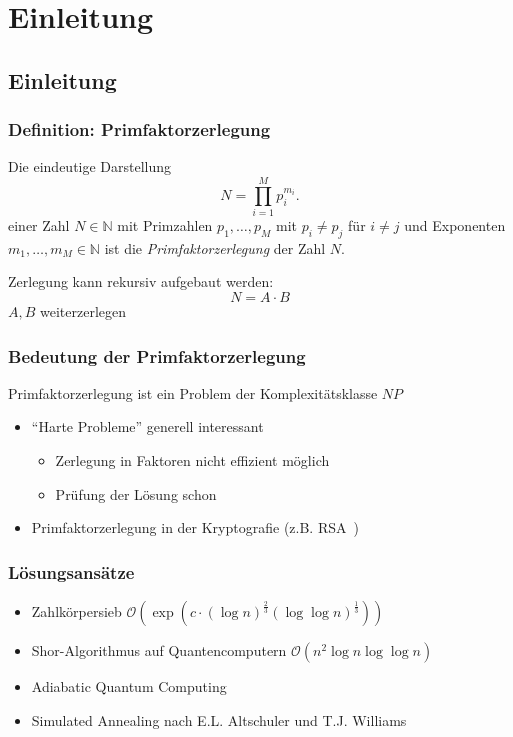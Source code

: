 \section{Einleitung}

\subsection*{Einleitung}
\begin{frame}
  \frametitle{Definition: Primfaktorzerlegung}
  \begin{definition}
    Die eindeutige Darstellung
    \begin{equation*}
      N=\prod\limits_{i=1}^M p_i^{m_i}.
    \end{equation*}
    einer Zahl $N\in\mathbb{N}$ mit Primzahlen $p_1,\dots,p_M$ mit $p_i \neq p_j$ für $i \neq j$ und Exponenten $m_1,\dots,m_M\in\mathbb{N}$ ist die \textit{Primfaktorzerlegung} der Zahl $N$.
  \end{definition}
  \pause{}

  Zerlegung kann rekursiv aufgebaut werden:
  \begin{equation*}
    N=A\cdot B
  \end{equation*}
  \Rightarrow{} $A, B$ weiterzerlegen
\end{frame}

\begin{frame}
  \frametitle{Bedeutung der Primfaktorzerlegung}
  Primfaktorzerlegung ist ein Problem der Komplexitätsklasse $NP$
  \begin{itemize}
    \item ``Harte Probleme'' generell interessant
      \begin{itemize}
        \item Zerlegung in Faktoren nicht effizient möglich
        \item Prüfung der Lösung schon
      \end{itemize}
    \item Primfaktorzerlegung in der Kryptografie (z.B. RSA~\cite{rsa})
  \end{itemize}
\end{frame}

\begin{frame}
  \frametitle{Lösungsansätze}
  \begin{itemize}
    \setlength{\itemsep}{5pt}
    \item Zahlkörpersieb $\mathcal{O}\left(\exp\left(c\cdot {\left(\log n\right)}^{\frac{2}{3}}{\left(\log\log n\right)}^{\frac{1}{3}}\right)\right)$~\cite{pomerance}
    \item Shor-Algorithmus auf Quantencomputern $\mathcal{O}\left(n^2 \log n \log\log n\right)$~\cite{shor}
    \item Adiabatic Quantum Computing~\cite{suter,xu}
    \item Simulated Annealing nach E.L. Altschuler und T.J. Williams~\cite{altschuler}
  \end{itemize}
\end{frame}
